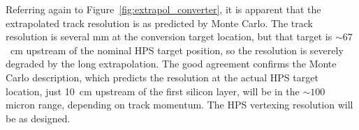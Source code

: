 
Referring again to Figure~\ref{fig:extrapol_converter}, it is apparent that the extrapolated track resolution is as predicted by Monte Carlo.
The track resolution is several mm at the conversion target location, but that target is $\sim67$~cm upstream of the nominal HPS target position, 
so the resolution is severely degraded by the long extrapolation. The good agreement confirms the Monte Carlo description, which predicts 
the resolution at the actual HPS target location, just 10~cm upstream of the first silicon layer, will be in the $\sim100$ micron range, 
depending on track momentum. The HPS vertexing resolution will be as designed.
